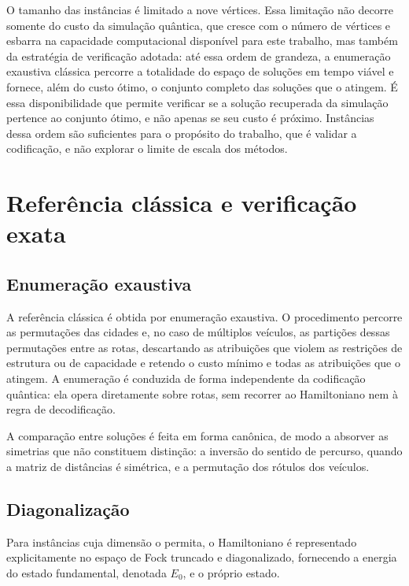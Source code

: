     O tamanho das instâncias é limitado a nove vértices. Essa limitação não decorre somente do custo da simulação quântica, que cresce com o número de vértices e esbarra na capacidade computacional disponível para este trabalho, mas também da estratégia de verificação adotada: até essa ordem de grandeza, a enumeração exaustiva clássica percorre a totalidade do espaço de soluções em tempo viável e fornece, além do custo ótimo, o conjunto completo das soluções que o atingem. É essa disponibilidade que permite verificar se a solução recuperada da simulação pertence ao conjunto ótimo, e não apenas se seu custo é próximo. Instâncias dessa ordem são suficientes para o propósito do trabalho, que é validar a codificação, e não explorar o limite de escala dos métodos.

\section{Referência clássica e verificação exata}\label{sec:met_referencia}

    \subsection{Enumeração exaustiva}\label{subsec:met_forca_bruta}

        A referência clássica é obtida por enumeração exaustiva. O procedimento percorre as permutações das cidades e, no caso de múltiplos veículos, as partições dessas permutações entre as rotas, descartando as atribuições que violem as restrições de estrutura ou de capacidade e retendo o custo mínimo e todas as atribuições que o atingem. A enumeração é conduzida de forma independente da codificação quântica: ela opera diretamente sobre rotas, sem recorrer ao Hamiltoniano nem à regra de decodificação.

        A comparação entre soluções é feita em forma canônica, de modo a absorver as simetrias que não constituem distinção: a inversão do sentido de percurso, quando a matriz de distâncias é simétrica, e a permutação dos rótulos dos veículos.

    \subsection{Diagonalização}\label{subsec:met_diagonalizacao}

        Para instâncias cuja dimensão o permita, o Hamiltoniano é representado explicitamente no espaço de Fock truncado e diagonalizado, fornecendo a energia do estado fundamental, denotada $E_0$, e o próprio estado.

